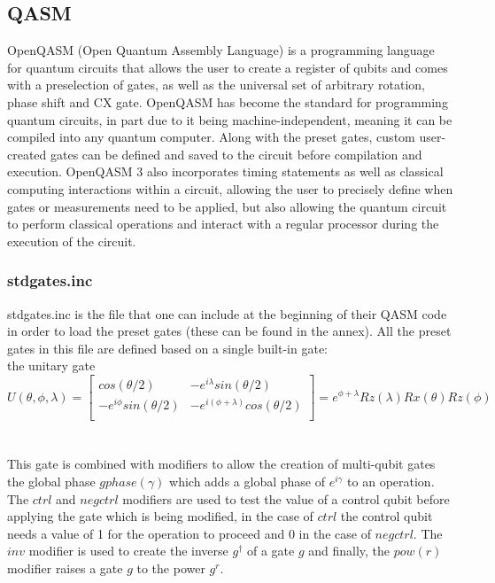 \subsection{QASM}
\label{sec:Qasm}
OpenQASM (Open Quantum Assembly Language) is a programming language for quantum circuits that allows the user to create a register of qubits and comes with a preselection of gates, as well as the universal set of arbitrary rotation,
 phase shift and CX gate. OpenQASM has become the standard for programming quantum circuits, in part due to it being machine-independent, meaning it can be compiled into any
  quantum computer\cite{crossOpenQASMBroaderDeeper2022}. 
  Along with the preset gates, custom user-created gates can be defined and saved to the circuit before compilation and execution. 
  OpenQASM 3 also incorporates timing statements as well as classical computing interactions within a circuit, allowing the user to precisely define when gates or 
  measurements need to be applied, but also allowing the quantum circuit to perform classical operations and interact with a regular processor during the execution of the circuit\cite{crossOpenQASMBroaderDeeper2022}.

  \subsubsection{stdgates.inc}
  stdgates.inc is the file that one can include at the beginning of their QASM code in order to load the preset gates (these can be found in the annex). All the preset gates in this file
 are defined based on a single built-in gate: \\
 the unitary gate $U(\theta,\phi,\lambda) = \begin{bmatrix}
  cos(\theta/2) & -e^{i\lambda}sin(\theta/2)\\
  -e^{i\phi}sin(\theta/2) & -e^{i(\phi+\lambda)}cos(\theta/2)\\
\end{bmatrix} = e^{\phi+\lambda}Rz(\lambda)Rx(\theta)Rz(\phi)$\cite{crossOpenQASMBroaderDeeper2022}\\ \\ 
This gate is combined with modifiers to allow the creation of multi-qubit gates the global phase $gphase(\gamma)$ which adds a global phase of $e^{i\gamma}$ to an operation.
The $ctrl$ and $negctrl$ modifiers are used to test the value of a control qubit before applying the gate which is being modified,
in the case of $ctrl$ the control qubit needs a value of 1 for the operation to proceed and 0 in the case of $negctrl$.
The $inv$ modifier is used to create the inverse $g^{\dagger}$ of a gate $g$ and finally, the $pow(r)$ modifier raises a gate $g$ to the power $g^r$.\cite{crossOpenQASMBroaderDeeper2022}


